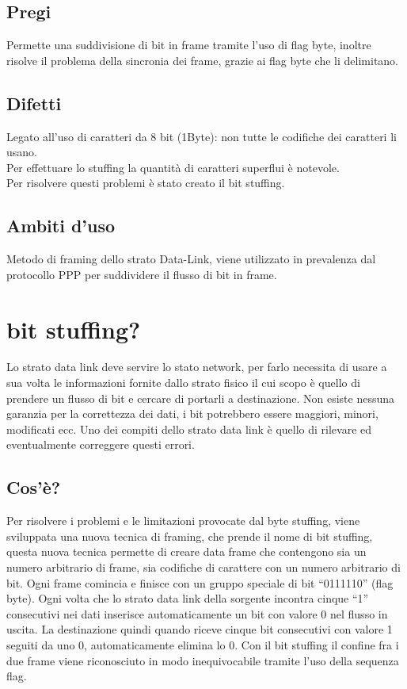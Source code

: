\subsection{Pregi}
Permette una suddivisione di bit in frame tramite l'uso di flag byte, inoltre risolve il problema della sincronia dei frame, grazie ai flag byte che li delimitano.

\subsection{Difetti}
Legato all'uso di caratteri da 8 bit (1Byte): non tutte le codifiche dei caratteri li usano.\\
Per effettuare lo stuffing la quantità di caratteri superflui è notevole.\\
Per risolvere questi problemi è stato creato il bit stuffing.

\subsection{Ambiti d'uso}
Metodo di framing dello strato Data-Link, viene utilizzato in prevalenza dal protocollo PPP per suddividere il flusso di bit in frame.

\section{bit stuffing?}

Lo strato data link deve servire lo stato network, per farlo necessita di usare a sua volta le informazioni fornite dallo strato fisico il cui scopo è quello di prendere un flusso di bit e cercare di portarli a destinazione.
Non esiste nessuna garanzia per la correttezza dei dati, i bit potrebbero essere maggiori, minori, modificati ecc. Uno dei compiti dello strato data link è quello di rilevare ed eventualmente correggere questi errori.
\subsection{Cos'è?}
Per risolvere i problemi e le limitazioni provocate dal byte stuffing, viene sviluppata una nuova tecnica di framing, che prende il nome di bit stuffing, questa nuova tecnica permette di creare data frame che contengono sia un numero arbitrario di frame, sia codifiche di carattere con un numero arbitrario di bit.
Ogni frame comincia e finisce con un gruppo speciale di bit “0111110” (flag byte). Ogni volta che lo strato data link della sorgente incontra cinque “1” consecutivi nei dati inserisce automaticamente un bit con valore 0 nel flusso in uscita. La destinazione quindi quando riceve cinque bit consecutivi con valore 1 seguiti da uno 0, automaticamente elimina lo 0.
Con il bit stuffing il confine fra i due frame viene riconosciuto in modo inequivocabile tramite l'uso della sequenza flag.

